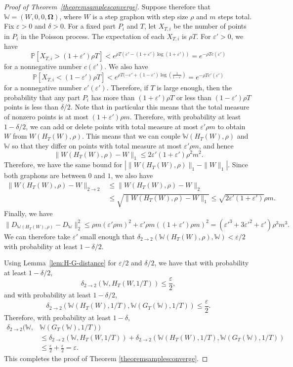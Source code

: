 \documentclass{amsart}
\numberwithin{equation}{section}
\numberwithin{figure}{section}
\theoremstyle{definition}
\theoremstyle{remark}
\newcommand{\bOmega}{{\mathbf{\Omega}}}
\newcommand{\PP}{\mathbb{P}}
\newcommand{\cW}{\mathbb{W}}
\newcommand{\deltt}{\delta_{2\to 2}}
\begin{document}
\begin{proof}[Proof of Theorem~\ref{theoremsamplesconverge}]
Suppose therefore that $\cW=(W,0,0,\bOmega)$, where $W$ is a step graphon
with step size $\rho$ and $m$ steps total. Fix $\varepsilon>0$ and
$\delta>0$. For a fixed part $P_i$ and $T$, let $X_{T,i}$ be the number of
points in $P_i$ in the Poisson process. The expectation of each $X_{T,i}$ is
$\rho T$. For $\varepsilon'>0$, we have
\[\PP\left[X_{T,i}>(1+\varepsilon ')\rho T \right] <
e^{\rho T (\varepsilon '-(1+\varepsilon ')\log(1+\varepsilon '))}
=e^{-\rho T c(\varepsilon ')}\] for a nonnegative number $c(\varepsilon')$.
We also have
\[\PP\left[X_{T,i}<(1-\varepsilon')\rho T \right]<e^{\rho T (-\varepsilon'+(1-\varepsilon')\log(\frac{1}{1-\varepsilon'})}=e^{-\rho T c'(\varepsilon')}
\]
for a nonnegative number $c'(\varepsilon')$. Therefore, if $T$ is large
enough, then the probability that any part $P_i$ has more than
$(1+\varepsilon')\rho T$ or less than $(1-\varepsilon')\rho T$ points is less
than $\delta/2$. Note that in particular this means that the total measure of
nonzero points is at most $(1+\varepsilon')\rho m$. Therefore, with
probability at least $1-\delta/2$, we can add or delete points with total
measure at most $\varepsilon'\rho m$ to obtain $W$ from $W(H_T(W),\rho)$.
This means that we can couple $\cW(H_T(W),\rho)$ and $\cW$ so that they
differ on points with total measure at most $\varepsilon'\rho m$, and hence
\[\|W(H_T(W),\rho)-W\|_1 \le 2\varepsilon'(1+\varepsilon')\rho^2m^2
.\] Therefore, we have the same bound for $|\|W(H_T(W),\rho)\|_1-\|W\|_1|$.
Since both graphons are between $0$ and $1$, we also have
\begin{align*}
\|W(H_T(W),\rho)-W\|_{2 \rightarrow 2}
&\le \|W(H_T(W),\rho)-W\|_2\\
&\le \sqrt{\|W(H_T(W),\rho)-W\|_1}
\le \sqrt{2\varepsilon'(1+\varepsilon')}\rho m.
\end{align*}
Finally, we have
\[\|D_{\cW(H_T(W),\rho)}-D_{\cW}\|_2^2 \le \rho m (\varepsilon' \rho m)^2+\varepsilon' \rho m ((1+\varepsilon')\rho m)^2=({\varepsilon'}^3+3{\varepsilon'}^2+\varepsilon')\rho^3m^3
.\] We can therefore take $\varepsilon'$ small enough that
$\deltt(\cW(H_T(W),\rho),\cW)<\varepsilon/2$ with probability at least
$1-\delta/2$.

Using Lemma~\ref{lem:H-G-distance} for $\varepsilon/2$ and $\delta/2$, we
have that with probability at least $1-\delta/2$,
\[\deltt(\cW,H_T(W,1/T))\le \frac{\varepsilon}{2}
,\] and with probability at least $1-\delta/2$,
\[\deltt(\cW(H_T(W),1/T),\cW(G_T(\cW),1/T)) \le \frac{\varepsilon}{2} .\]
Therefore, with probability at least $1-\delta$,
\begin{align*}
\deltt(\cW,&\cW(G_T(\cW),1/T))\\
 &\le \deltt(\cW,H_T(W,1/T))+\deltt(\cW(H_T(W),1/T),\cW(G_T(\cW),1/T))\\
& \le \frac{\varepsilon}{2}+\frac{\varepsilon}{2}=\varepsilon
.
\end{align*}
This completes the proof of Theorem \ref{theoremsamplesconverge}.
\end{proof}
\end{document}
